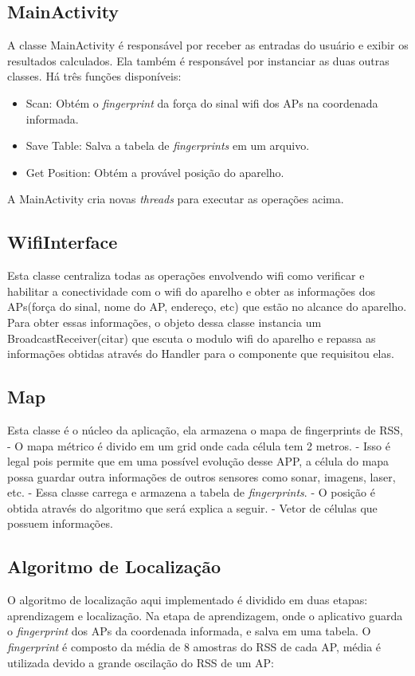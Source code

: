   \subsection{MainActivity}
  A classe MainActivity é responsável por receber as entradas do usuário e exibir os resultados calculados.
  Ela também é responsável por instanciar as duas outras classes. Há três funções disponíveis: 
  \begin{itemize}
   \item Scan: Obtém o \textit{fingerprint} da força do sinal wifi dos APs na coordenada informada.
   \item Save Table: Salva a tabela de \textit{fingerprints} em um arquivo.
   \item Get Position: Obtém a provável posição do aparelho. 
  \end{itemize}

  A MainActivity cria novas \textit{threads} para executar as operações acima.
  
  \subsection{WifiInterface}
  
  Esta classe centraliza todas as operações envolvendo wifi como verificar e habilitar a conectividade
  com o wifi do aparelho e obter as informações dos APs(força do sinal, nome do AP, endereço, etc) 
  que estão no alcance do aparelho. Para obter essas informações, o objeto dessa classe
  instancia um BroadcastReceiver(citar) que escuta o modulo wifi do aparelho e repassa 
  as informações obtidas através do Handler para o componente que requisitou elas.
  
  \subsection{Map}
  Esta classe é o núcleo da aplicação, ela armazena o mapa de fingerprints de RSS, 
  - O mapa métrico é divido em um grid onde cada célula tem 2 metros.
  - Isso é legal pois permite que em uma possível evolução desse APP, a célula do mapa possa guardar
  outra informações de outros sensores como sonar, imagens, laser, etc.
  - Essa classe carrega e armazena a tabela de \textit{fingerprints}.
  - O posição é obtida através do algoritmo que será explica a seguir.
  - Vetor de células que possuem informações.
  
  \subsection{Algoritmo de Localização}
  O algoritmo de localização aqui implementado é dividido em duas etapas: aprendizagem e localização. Na etapa de aprendizagem, 
  onde o aplicativo guarda o \textit{fingerprint} dos APs da coordenada informada,
  e salva em uma tabela. O \textit{fingerprint} é composto da média de 8 amostras do RSS de cada AP, média é utilizada 
  devido a grande oscilação do RSS de um AP:
  
